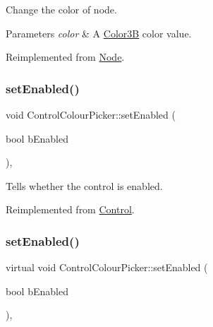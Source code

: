 Change the color of node. 
\begin{DoxyParams}{Parameters}
{\em color} & A \hyperlink{structColor3B}{Color3B} color value. \\
\hline
\end{DoxyParams}


Reimplemented from \hyperlink{classNode_af45037de5b13602263b1ce51b50cafdd}{Node}.

\mbox{\label{classControlColourPicker_ac332c171d8aa481120139479c78da22b}} 
\subsubsection{\texorpdfstring{set\+Enabled()}{setEnabled()}\hspace{0.1cm}{\footnotesize\ttfamily [1/2]}}
{\footnotesize\ttfamily void Control\+Colour\+Picker\+::set\+Enabled (\begin{DoxyParamCaption}\item[{bool}]{b\+Enabled }\end{DoxyParamCaption})\hspace{0.3cm}{\ttfamily [override]}, {\ttfamily [virtual]}}

Tells whether the control is enabled. 

Reimplemented from \hyperlink{classControl_a55339ae920182245d5ec114c33f4b1fd}{Control}.

\mbox{\label{classControlColourPicker_a233d6048e0899b35f23aaa557a839069}} 
\subsubsection{\texorpdfstring{set\+Enabled()}{setEnabled()}\hspace{0.1cm}{\footnotesize\ttfamily [2/2]}}
{\footnotesize\ttfamily virtual void Control\+Colour\+Picker\+::set\+Enabled (\begin{DoxyParamCaption}\item[{bool}]{b\+Enabled }\end{DoxyParamCaption})\hspace{0.3cm}{\ttfamily [override]}, {\ttfamily [virtual]}}

